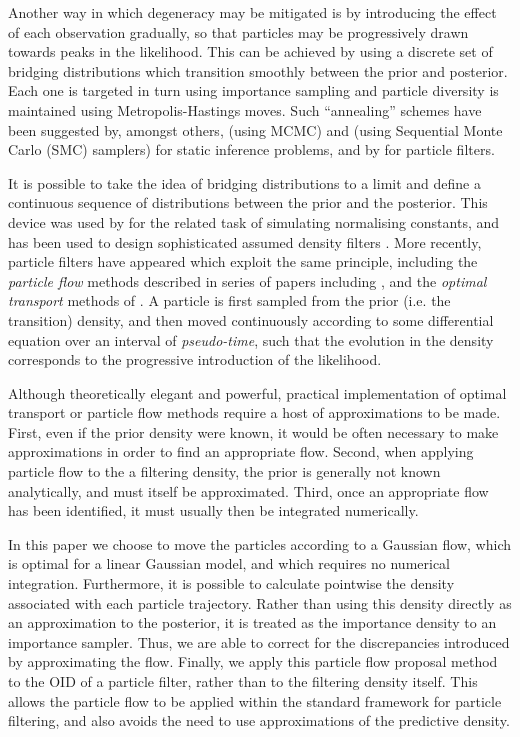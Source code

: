 \documentclass[12pt]{article}
\begin{document}
Another way in which degeneracy may be mitigated is by introducing the effect of each observation gradually, so that particles may be progressively drawn towards peaks in the likelihood. This can be achieved by using a discrete set of bridging distributions which transition smoothly between the prior and posterior. Each one is targeted in turn using importance sampling and particle diversity is maintained using Metropolis-Hastings moves. Such ``annealing'' schemes have been suggested by, amongst others, \citet{Neal2001} (using MCMC) and \citet{DelMoral2006} (using Sequential Monte Carlo (SMC) samplers) for static inference problems, and by \citet{Godsill2001b,Gall2007,Deutscher2000,Oudjane2000} for particle filters.

It is possible to take the idea of bridging distributions to a limit and define a continuous sequence of distributions between the prior and the posterior. This device was used by \citet{Gelman1998} for the related task of simulating normalising constants, and has been used to design sophisticated assumed density filters \citep{Hanebeck2003a,Hanebeck2012,Hagmar2011}. More recently, particle filters have appeared which exploit the same principle, including the \emph{particle flow} methods described in series of papers including \citep{Daum2008,Daum2011d}, and the \emph{optimal transport} methods of \cite{Reich2011,Reich2012a}. A particle is first sampled from the prior (i.e. the transition) density, and then moved continuously according to some differential equation over an interval of \emph{pseudo-time}, such that the evolution in the density corresponds to the progressive introduction of the likelihood.

Although theoretically elegant and powerful, practical implementation of optimal transport or particle flow methods require a host of approximations to be made. First, even if the prior density were known, it would be often necessary to make approximations in order to find an appropriate flow. Second, when applying particle flow to the a filtering density, the prior is generally not known analytically, and must itself be approximated. Third, once an appropriate flow has been identified, it must usually then be integrated numerically.

In this paper we choose to move the particles according to a Gaussian flow, which is optimal for a linear Gaussian model, and which requires no numerical integration. Furthermore, it is possible to calculate pointwise the density associated with each particle trajectory. Rather than using this density directly as an approximation to the posterior, it is treated as the importance density to an importance sampler. Thus, we are able to correct for the discrepancies introduced by approximating the flow. Finally, we apply this particle flow proposal method to the OID of a particle filter, rather than to the filtering density itself. This allows the particle flow to be applied within the standard framework for particle filtering, and also avoids the need to use approximations of the predictive density.
\end{document}
